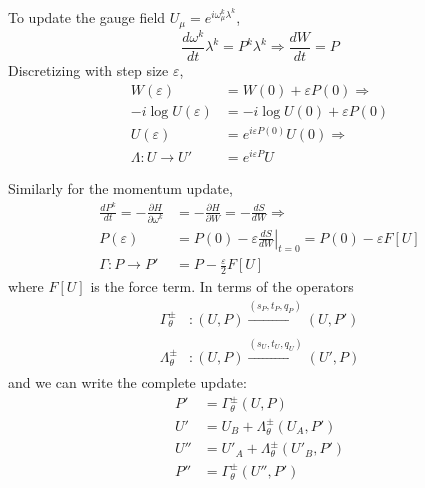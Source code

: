 \documentclass[a4paper,11pt]{article}
\begin{document}
To update the gauge field $U_{\mu} = e^{i\omega_{\mu}^{k} \lambda^{k}}$,
%
\begin{equation}
    \frac{d\omega^{k}}{dt}\lambda^{k} = P^{k} \lambda^{k} \Longrightarrow \frac{dW}{dt} = P
\end{equation}
%
Discretizing with step size $\varepsilon$,
%
\begin{align}
    W(\varepsilon) &= W(0) + \varepsilon P(0) \Longrightarrow \\
    -i \log U(\varepsilon) &= - i \log U(0) + \varepsilon P(0) \\
    U(\varepsilon) &= e^{i \varepsilon P(0)} U(0) \Longrightarrow \\
    \Lambda: U \rightarrow U' &= e^{i \varepsilon P} U
\end{align}
%

Similarly for the momentum update,
%
\begin{align}
    \frac{dP^{k}}{dt} = - \frac{\partial H}{\partial \omega^{k}} &= - \frac{\partial H}{\partial W} = - \frac{dS}{dW} \Longrightarrow \\
    P(\varepsilon) &= P(0) - \varepsilon \left.\frac{dS}{dW}\right|_{t=0} = P(0) - \varepsilon F[U]\\
    \Gamma: P \rightarrow P' &= P - \frac{\varepsilon}{2} F[U]
\end{align}
%
where $F[U]$ is the force term.
%
In terms of the operators
%
\begin{align}
    \Gamma^{\pm}_{\theta}&: (U, P) \xrightarrow[]{\left(s_{P}, t_{P}, q_{P}\right)} (U, P') \\
    \Lambda^{\pm}_{\theta}&: (U, P)\xrightarrow[]{\left(s_{U}, t_{U}, q_{U}\right)} (U', P) 
\end{align}
%
and we can write the complete update:
%
\begin{align}
    P' &= \Gamma^{\pm}_{\theta}(U, P) \\
    U' &= U_{B} + \Lambda^{\pm}_{\theta}(U_{A}, P') \\ 
    U'' &= U'_{A} + \Lambda^{\pm}_{\theta}(U'_{B}, P')\\
    P'' &= \Gamma^{\pm}_{\theta}(U'', P')
\end{align}
%
\end{document}
